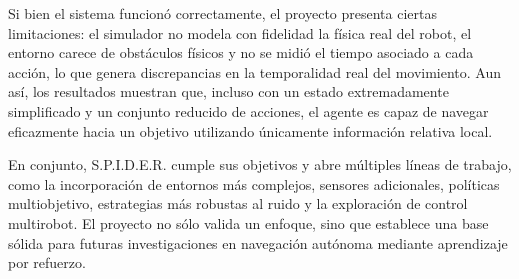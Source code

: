 \documentclass[conference]{IEEEtran}
\begin{document}
Si bien el sistema funcionó correctamente, el proyecto presenta ciertas limitaciones: el simulador no modela con fidelidad la física real del robot, el entorno carece de obstáculos físicos y no se midió el tiempo asociado a cada acción, lo que genera discrepancias en la temporalidad real del movimiento. Aun así, los resultados muestran que, incluso con un estado extremadamente simplificado y un conjunto reducido de acciones, el agente es capaz de navegar eficazmente hacia un objetivo utilizando únicamente información relativa local.

En conjunto, \textsc{S.P.I.D.E.R.} cumple sus objetivos y abre múltiples líneas de trabajo, como la incorporación de entornos más complejos, sensores adicionales, políticas multiobjetivo, estrategias más robustas al ruido y la exploración de control multirobot. El proyecto no sólo valida un enfoque, sino que establece una base sólida para futuras investigaciones en navegación autónoma mediante aprendizaje por refuerzo.



\end{document}
